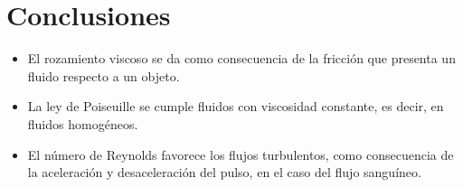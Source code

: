 \documentclass[osajnl,twocolumn,showpacs,superscriptaddress,10pt]{revtex4-2}
\begin{document}
\section{Conclusiones}
    \begin{itemize}
        \item El rozamiento viscoso se da como consecuencia de la fricción que presenta un fluido respecto a un objeto.
        \item La ley de Poiseuille se cumple fluidos con viscosidad constante, es decir, en fluidos homogéneos.
        \item El número de Reynolds favorece los flujos turbulentos, como consecuencia de la aceleración y desaceleración del pulso, en el caso del flujo sanguíneo.
    \end{itemize}

    \nocite{*}
    
\end{document}
